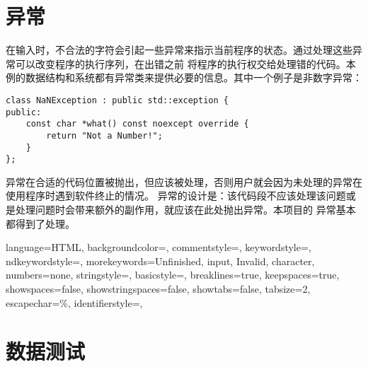 
\chapter{异常}
在输入时，不合法的字符会引起一些异常来指示当前程序的状态。通过处理这些异常可以改变程序的执行序列，在出错之前%
将程序的执行权交给处理错的代码。本例的数据结构和系统都有异常类来提供必要的信息。其中一个例子是非数字异常：
\begin{lstlisting}[firstnumber=244, caption=NaNException 异常类]
class NaNException : public std::exception {
public:
    const char *what() const noexcept override {
        return "Not a Number!";
    }
};
\end{lstlisting}

异常在合适的代码位置被抛出，但应该被处理，否则用户就会因为未处理的异常在使用程序时遇到软件终止的情况。%
异常的设计是：该代码段不应该处理该问题或是处理问题时会带来额外的副作用，就应该在此处抛出异常。本项目的%
异常基本都得到了处理。


 {
    language=HTML,
    backgroundcolor=\color{CPPDark},   
    commentstyle=\color{CPPLight},
    keywordstyle=\color{red},
    ndkeywordstyle={},
    morekeywords={Unfinished, input, Invalid, character},
    numbers=none,
    stringstyle={},
    basicstyle=\fira\color{white}\footnotesize,
    breaklines=true,                                     
    keepspaces=true,                                     
    showspaces=false,                
    showstringspaces=false,
    showtabs=false,                  
    tabsize=2,
    escapechar=\%,
    identifierstyle={},
}

\chapter{数据测试}

